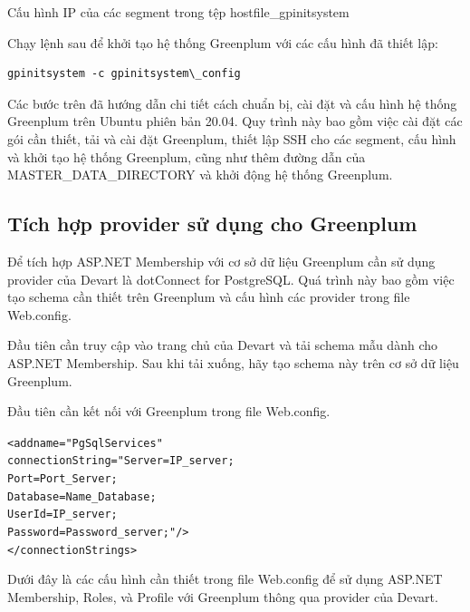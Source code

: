 \documentclass{article}[14pt]
\begin{document}
Cấu hình IP của các segment trong tệp hostfile\_gpinitsystem

Chạy lệnh sau để khởi tạo hệ thống Greenplum với các cấu hình đã thiết lập:

\begin{verbatim}
gpinitsystem -c gpinitsystem\_config
\end{verbatim}






Các bước trên đã hướng dẫn chi tiết cách chuẩn bị, cài đặt và cấu hình hệ thống Greenplum trên Ubuntu phiên bản 20.04. Quy trình này bao gồm việc cài đặt các gói cần thiết, tải và cài đặt Greenplum, thiết lập SSH cho các segment, cấu hình và khởi tạo hệ thống Greenplum, cũng như thêm đường dẫn của MASTER\_DATA\_DIRECTORY và khởi động hệ thống Greenplum.



\subsection{Tích hợp provider sử dụng cho Greenplum}

Để tích hợp ASP.NET Membership với cơ sở dữ liệu Greenplum cần sử dụng provider của Devart là dotConnect for PostgreSQL. Quá trình này bao gồm việc tạo schema cần thiết trên Greenplum và cấu hình các provider trong file Web.config.

Đầu tiên cần truy cập vào trang chủ của Devart và tải schema mẫu dành cho ASP.NET Membership. Sau khi tải xuống, hãy tạo schema này trên cơ sở dữ liệu Greenplum.

Đầu tiên cần kết nối với Greenplum trong file Web.config.


\begin{mdframed}[backgroundcolor=white, linecolor=black, roundcorner=5pt]
\begin{alltt}
<add name="PgSqlServices" 
     connectionString="Server=IP_server;
                       Port=Port_Server;
                       Database=Name_Database;
                       User Id=IP_server;
                       Password=Password_server;"/>
</connectionStrings>
\end{alltt}
\end{mdframed}

Dưới đây là các cấu hình cần thiết trong file Web.config để sử dụng ASP.NET Membership, Roles, và Profile với Greenplum thông qua provider của Devart.
\end{document}
